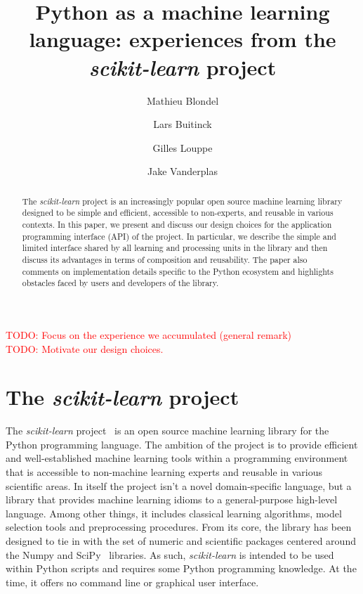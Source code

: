 \documentclass{llncs}
\title{Python as a machine learning language:
       experiences from the \textit{scikit-learn} project}
\author{Mathieu Blondel\inst{1} \and
        Lars Buitinck\inst{2} \and
        Gilles Louppe\inst{3} \and
        Jake Vanderplas\inst{4}}
\institute{Graduate School of System Informatics, Kobe University \and
           Informatics Institute, University of Amsterdam \and
           Department of EE \& CS, University of Liège \and
           Astronomy Department, University of Washington}
\begin{document}
\maketitle

\begin{abstract}
The \textit{scikit-learn} project is an increasingly popular open source machine
learning library designed to be simple and efficient, accessible to non-experts,
and reusable in various contexts. In this paper, we present and discuss our
design choices for the application programming interface (API) of the project.
In particular, we describe the simple and limited interface shared by all
learning and processing units in the library and then discuss its advantages in
terms of composition and reusability. The paper also comments on implementation
details specific to the Python ecosystem and highlights obstacles faced by users
and developers of the library.
\end{abstract}

\noindent \textcolor{red}{TODO: Focus on the experience we accumulated (general remark)}\\
\textcolor{red}{TODO: Motivate our design choices.}

\section{The \textit{scikit-learn} project}

The \textit{scikit-learn} project~\citep{pedregosa2011} is an open source
machine learning library for the Python programming language. The ambition of
the project is to provide efficient and well-established machine learning tools
within a programming environment that is accessible to non-machine learning
experts and reusable in various scientific areas. In itself the project isn't
a novel domain-specific language, but a library that provides machine
learning idioms to a general-purpose high-level language. Among other things,
it includes classical learning algorithms, model selection tools and
preprocessing
procedures. From its core, the library has been designed to tie in with the set
of numeric and scientific packages centered around the Numpy and
SciPy~\citep{vanderwalt2011, varoquaux2013scipy} libraries. As such, \textit
{scikit-learn} is intended to be used within Python scripts and requires some
Python programming knowledge. At the time, it offers no command line or
graphical user interface.
\end{document}
